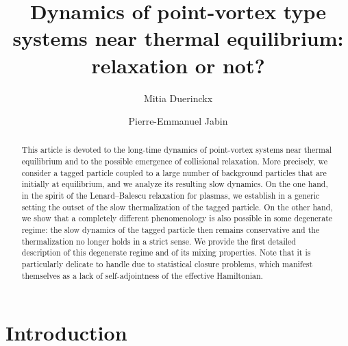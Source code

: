 \documentclass[a4paper,11pt,reqno,noindent]{amsart}
\title[Dynamics of {point-vortex type} systems near equilibrium]{Dynamics of {point-vortex type} systems near thermal equilibrium: relaxation or not?}
\author[M. Duerinckx]{Mitia Duerinckx}
\author[P.-E. Jabin]{Pierre-Emmanuel Jabin}
\theoremstyle{plain}
\numberwithin{equation}{section}
\newcommand{\3}{|\!|\!|}
\begin{document}

\begin{abstract}
This article is devoted to the long-time dynamics of point-vortex systems near thermal equilibrium and to the possible emergence of collisional relaxation. More precisely, we consider a tagged particle coupled to a large number of background particles that are initially at equilibrium, and we analyze its resulting slow dynamics. On the one hand, in the spirit of the Lenard--Balescu relaxation for plasmas, we establish in a generic setting the outset of the slow thermalization of the tagged particle. On the other hand, we show that a completely different phenomenology is also possible in some degenerate regime: the slow dynamics of the tagged particle then remains conservative and the thermalization no longer holds in a strict sense. We provide the first detailed description of this degenerate regime and of its mixing properties. Note that it is particularly delicate to handle due to statistical closure problems, which manifest themselves as a lack of self-adjointness of the effective Hamiltonian.
\end{abstract}

\maketitle
\setcounter{tocdepth}{1}

\tableofcontents

\section{Introduction}
\end{document}
